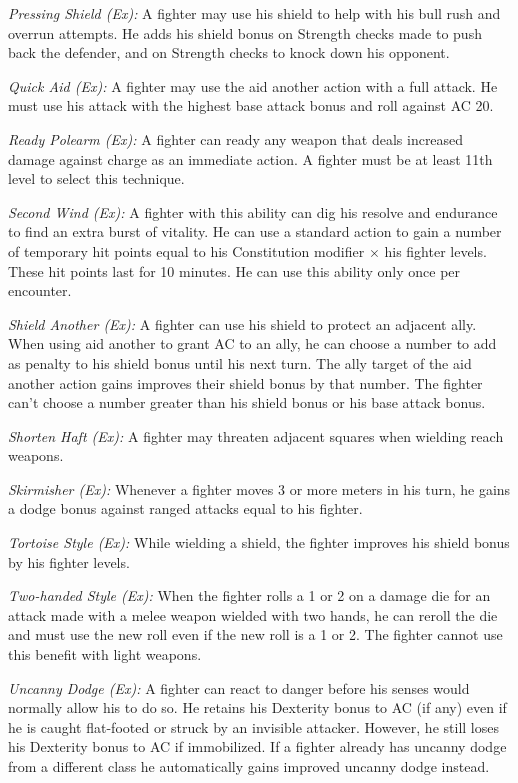 \textit{Pressing Shield (Ex):} A fighter may use his shield to help with his bull rush and overrun attempts. He adds his shield bonus on Strength checks made to push back the defender, and on Strength checks to knock down his opponent.

\textit{Quick Aid (Ex):} A fighter may use the aid another action with a full attack. He must use his attack with the highest base attack bonus and roll against AC 20.

\textit{Ready Polearm (Ex):} A fighter can ready any weapon that deals increased damage against charge as an immediate action. A fighter must be at least 11th level to select this technique.

\textit{Second Wind (Ex):} A fighter with this ability can dig his resolve and endurance to find an extra burst of vitality. He can use a standard action to gain a number of temporary hit points equal to his Constitution modifier $\times$ his fighter levels. These hit points last for 10 minutes. He can use this ability only once per encounter.

\textit{Shield Another (Ex):} A fighter can use his shield to protect an adjacent ally. When using aid another to grant AC to an ally, he can choose a number to add as penalty to his shield bonus until his next turn. The ally target of the aid another action gains improves their shield bonus by that number. The fighter can't choose a number greater than his shield bonus or his base attack bonus.

\textit{Shorten Haft (Ex):} A fighter may threaten adjacent squares when wielding reach weapons.

\textit{Skirmisher (Ex):} Whenever a fighter moves 3 or more meters in his turn, he gains a dodge bonus against ranged attacks equal to \onequarter his fighter.

\textit{Tortoise Style (Ex):} While wielding a shield, the fighter improves his shield bonus by \onequarter his fighter levels.

\textit{Two-handed Style (Ex):} When the fighter rolls a 1 or 2 on a damage die for an attack made with a melee weapon wielded with two hands, he can reroll the die and must use the new roll even if the new roll is a 1 or 2. The fighter cannot use this benefit with light weapons.

\textit{Uncanny Dodge (Ex):} A fighter can react to danger before his senses would normally allow his to do so. He retains his Dexterity bonus to AC (if any) even if he is caught flat-footed or struck by an invisible attacker. However, he still loses his Dexterity bonus to AC if immobilized. If a fighter already has uncanny dodge from a different class he automatically gains improved uncanny dodge instead.


